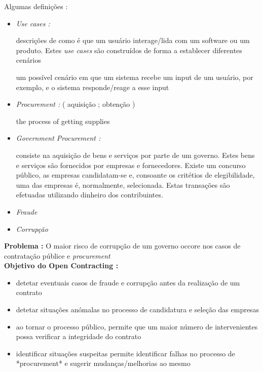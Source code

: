 \documentclass{book}
\begin{document}
Algumas definições : 

\begin{itemize}

		\item  \textit{Use cases :}
		
				\subitem descrições de como é que um usuário interage/lida com um software ou um produto. Estes \textit{use cases} são construídos de forma a establecer diferentes cenários 
				
				\subitem um possível cenário em que um sistema recebe um input de um usuário, por exemplo, e o sistema responde/reage a esse input 
				
		\item  \textit{Procurement : } ( aquisição ; obtenção )
		
				\subitem the process of getting supplies 
				
		\item   \textit{Government Procurement :} 
		
			\subitem consiste na aquisição de bens e serviços por parte de um governo. Estes bens e serviços são fornecidos por empresas e fornecedores. Existe um concurso público, as empresas candidatam-se e, consoante os critétios de elegibilidade, uma das empresas é, normalmente, selecionada. Estas transações são efetuadas utilizando dinheiro dos contribuintes.
		
		\item  \textit{Fraude} 
		\item  \textit{Corrupção}

\end{itemize}



\textbf{Problema :}  O maior risco de corrupção de um governo occore nos casos de contratação públice e \textit{procurement} \\


  
\textbf{Objetivo do Open Contracting :} 
\begin{itemize}
	
	\item detetar eventuais casos de fraude e corrupção antes da realização de um contrato
	\item detetar situações anómalas no processo de candidatura e seleção das empresas
	\item ao tornar o processo público, permite que um maior número de intervenientes possa verificar a integridade do contrato
	\item identificar situações suspeitas permite  identificar falhas no processo de *procurement* e sugerir mudanças/melhorias ao mesmo
	
\end{itemize}
\end{document}
